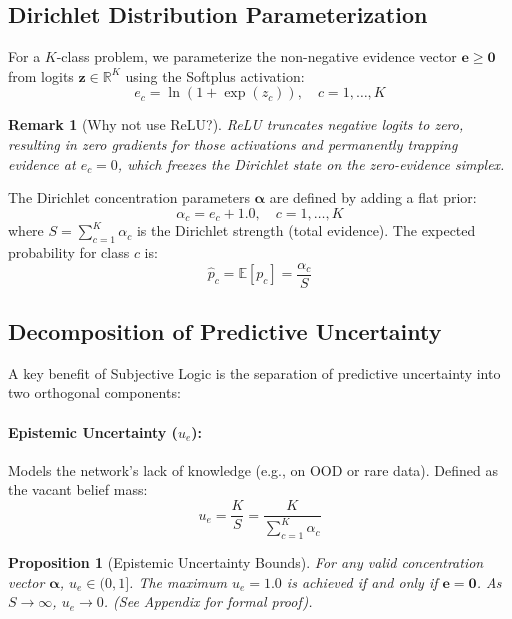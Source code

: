 \documentclass[letterpaper]{article} %
\newcommand{\R}{\mathbb{R}}
\newcommand{\E}{\mathbb{E}}
\newtheorem{remark}{Remark}
\newtheorem{proposition}{Proposition}
\begin{document}
\subsection{Dirichlet Distribution Parameterization}
For a $K$-class problem, we parameterize the non-negative evidence vector $\bm{e} \ge \bm{0}$ from logits $\bm{z} \in \R^K$ using the Softplus activation:
\begin{equation}\label{eq:softplus}
    e_c = \ln(1 + \exp(z_c)), \quad c = 1, \ldots, K
\end{equation}
\begin{remark}[Why not use ReLU?]
ReLU truncates negative logits to zero, resulting in zero gradients for those activations and permanently trapping evidence at $e_c = 0$, which freezes the Dirichlet state on the zero-evidence simplex.
\end{remark}
The Dirichlet concentration parameters $\bm{\alpha}$ are defined by adding a flat prior:
\begin{equation}\label{eq:alpha}
    \alpha_c = e_c + 1.0, \quad c = 1, \ldots, K
\end{equation}
where $S = \sum_{c=1}^K \alpha_c$ is the Dirichlet strength (total evidence). The expected probability for class $c$ is:
\begin{equation}\label{eq:p_hat}
    \hat{p}_c = \E[p_c] = \frac{\alpha_c}{S}
\end{equation}

\subsection{Decomposition of Predictive Uncertainty}\label{subsec:uncertainties}
A key benefit of Subjective Logic is the separation of predictive uncertainty into two orthogonal components:

\paragraph{Epistemic Uncertainty ($u_e$):} Models the network's lack of knowledge (e.g., on OOD or rare data). Defined as the vacant belief mass:
\begin{equation}\label{eq:u_e}
    u_e = \frac{K}{S} = \frac{K}{\sum_{c=1}^K \alpha_c}
\end{equation}
\begin{proposition}[Epistemic Uncertainty Bounds]
For any valid concentration vector $\bm{\alpha}$, $u_e \in (0, 1]$. The maximum $u_e = 1.0$ is achieved if and only if $\bm{e} = \bm{0}$. As $S \to \infty$, $u_e \to 0$. (See Appendix for formal proof).
\end{proposition}
\end{document}
